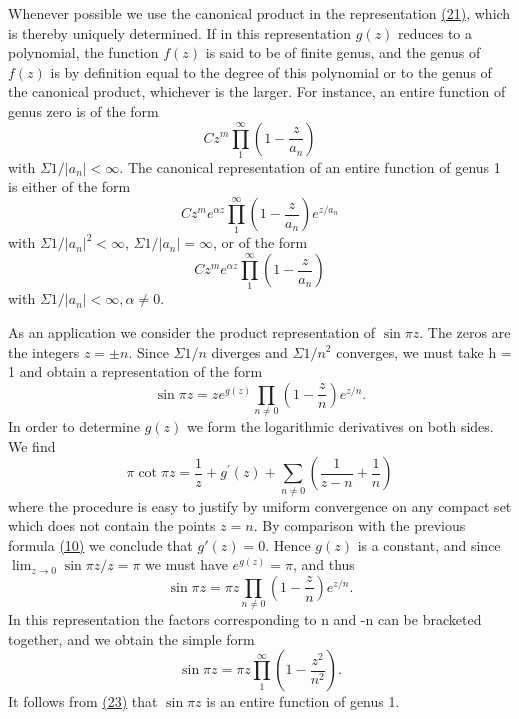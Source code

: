 Whenever possible we use the canonical product in the representation \hyperref[eq:5.21]{(21)}, which is thereby uniquely determined. If in this representation $g(z)$ reduces to a polynomial, the function $f(z)$ is said to be of finite genus, and the genus of $f(z)$ is by definition equal to the degree of this polynomial or to the genus of the canonical product, whichever is the larger. For instance, an entire function of genus zero is of the form
\begin{equation*}
C z ^ {m} \prod_ {1} ^ {\infty} \left(1 - \frac {z}{a _ {n}}\right)
\end{equation*}
with $\Sigma 1 / |a_n| < \infty$. The canonical representation of an entire function of genus 1 is either of the form
\begin{equation*}
C z ^ {m} e ^ {\alpha z} \prod_ {1} ^ {\infty} \left(1 - \frac {z}{a _ {n}}\right) e ^ {z / a _ {n}}
\end{equation*}
with $\Sigma 1 / |a_n|^2 < \infty$, $\Sigma 1 / |a_n| = \infty$, or of the form
\begin{equation*}
C z ^ {m} e ^ {\alpha z} \prod_ {1} ^ {\infty} \left(1 - \frac {z}{a _ {n}}\right)
\end{equation*}
with $\Sigma 1 / |a_n| < \infty, \alpha \neq 0$.

As an application we consider the product representation of $\sin \pi z$. The zeros are the integers $z = \pm n$. Since $\Sigma1/n$ diverges and $\Sigma1/n^{2}$ converges, we must take h = 1 and obtain a representation of the form
\begin{equation*}
\sin \pi z = z e ^ {g (z)} \prod_ {n \neq 0} \left(1 - \frac {z}{n}\right) e ^ {z / n}.
\end{equation*}
In order to determine $g(z)$ we form the logarithmic derivatives on both sides. We find
\begin{equation*}
\pi \cot \pi z = \frac {1}{z} + g ^ {\prime} (z) + \sum_ {n \neq 0} \left(\frac {1}{z - n} + \frac {1}{n}\right)
\end{equation*}
where the procedure is easy to justify by uniform convergence on any compact set which does not contain the points $z = n$. By comparison with the previous formula \hyperref[eq:5.10]{(10)} we conclude that $g'(z) = 0$. Hence $g(z)$ is a constant, and since $\lim_{z \to 0} \sin \pi z / z = \pi$ we must have $e^{g(z)} = \pi$, and thus
\begin{equation*}
\sin \pi z = \pi z \prod_ {n \neq 0} \left(1 - \frac {z}{n}\right) e ^ {z / n}.\tag{23}\label{eq:5.23}
\end{equation*}
In this representation the factors corresponding to n and -n can be bracketed together, and we obtain the simple form
\begin{equation*}
\sin \pi z = \pi z \prod_ {1} ^ {\infty} \left(1 - \frac {z ^ {2}}{n ^ {2}}\right).\tag{24}\label{eq:5.24}
\end{equation*}
It follows from \hyperref[eq:5.23]{(23)} that $\sin \pi z$ is an entire function of genus 1.

